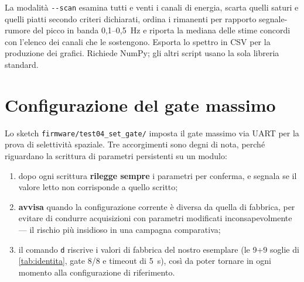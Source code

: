 La modalità \texttt{-{}-scan} esamina tutti e venti i canali di energia, scarta
quelli saturi e quelli piatti secondo criteri dichiarati, ordina i rimanenti per
rapporto segnale-rumore del picco in banda 0,1--0,5~Hz e riporta la mediana delle
stime concordi con l'elenco dei canali che le sostengono. Esporta lo spettro in CSV
per la produzione dei grafici. Richiede NumPy; gli altri script usano la sola
libreria standard.

\section{Configurazione del gate massimo}

Lo sketch \texttt{firmware/test04\_set\_gate/} imposta il gate massimo via UART per
la prova di selettività spaziale. Tre accorgimenti sono degni di nota, perché
riguardano la scrittura di parametri persistenti su un modulo:

\begin{enumerate}[leftmargin=1.8em,itemsep=2pt]
  \item dopo ogni scrittura \textbf{rilegge sempre} i parametri per conferma, e
        segnala se il valore letto non corrisponde a quello scritto;
  \item \textbf{avvisa} quando la configurazione corrente è diversa da quella di
        fabbrica, per evitare di condurre acquisizioni con parametri modificati
        inconsapevolmente --- il rischio più insidioso in una campagna comparativa;
  \item il comando \texttt{d} riscrive i valori di fabbrica del nostro esemplare
        (le 9+9 soglie di \cref{tab:identita}, gate 8/8 e timeout di 5~s),
        così da poter tornare in ogni momento alla configurazione di riferimento.
\end{enumerate}
